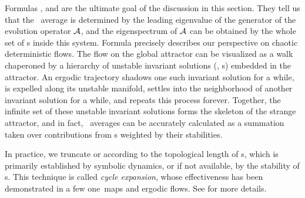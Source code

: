 Formulas ,  and 
are the ultimate goal of the discussion
in this section. They tell us that the \spt\ average is determined
by the leading eigenvalue of the generator of the evolution operator $\mathcal{A}$, and
the eigenspectrum of $\mathcal{A}$ can be obtained by the whole set of \po s inside
this system. Formula  precisely describes our perspective on chaotic
deterministic flows. The flow on the global attractor can be
visualized as a walk chaperoned by a hierarchy of unstable invariant
solutions (\eqva, \po s) embedded in the attractor. An
ergodic trajectory shadows one such invariant solution for a while, is
expelled along its unstable manifold, settles into the neighborhood of
another invariant solution for a while, and repeats this process forever.
Together, the infinite set of these unstable invariant solutions forms
the skeleton of the strange attractor,
and in fact, \spt\ averages can be
accurately calculated as a summation taken over contributions from
\po s weighted by their stabilities.

In practice, we truncate  or 
according to the topological length of \po s,
which is primarily established by symbolic dynamics, or if not available, by
the stability of \po s. This technique is called \emph{cycle expansion},
whose effectiveness has been demonstrated in a
few one\dmn\ maps and
ergodic flows. See 
for more details.
